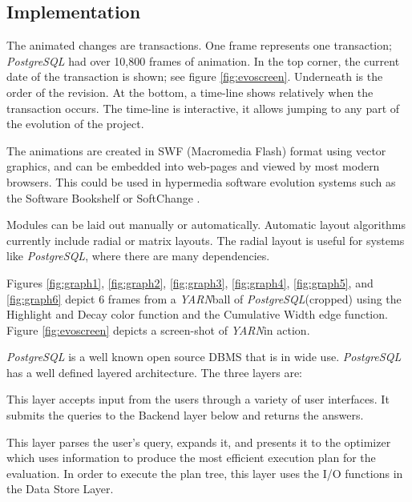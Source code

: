 \documentclass[times, 10pt,twocolumn]{article}
\newcommand{\yarn}{\emph{YARN\xspace}}
\newcommand{\postgresql}{\emph{PostgreSQL}\xspace}
\newcommand{\Subsection}[1]{\subsection{#1}}
\newcommand{\shtn}{\vspace*{-.5em}}
\begin{document}
\shtn
\Subsection{Implementation}
\shtn

The animated changes are transactions. One frame represents one
transaction; \postgresql had over 10,800 frames of animation.  In the
top corner, the current date of the transaction is shown; see figure
\ref{fig:evoscreen}.  Underneath is the order of the revision. At the
bottom, a time-line shows relatively when the transaction occurs.
The time-line is interactive, it allows jumping to any part of the
evolution of the project. 

The animations are created in SWF (Macromedia Flash) format using
vector graphics, and can be embedded into web-pages and viewed by most
modern browsers.  This could be used in hypermedia software evolution
systems such as the Software Bookshelf \cite{pbs} or SoftChange
\cite{dmgseke2004}.

Modules can be laid out manually or automatically. Automatic layout
algorithms currently include radial or matrix layouts. The radial
layout is useful for systems like \postgresql, where there are many
dependencies.

Figures \ref{fig:graph1}, \ref{fig:graph2}, \ref{fig:graph3},
\ref{fig:graph4}, \ref{fig:graph5}, and \ref{fig:graph6} depict 6
frames from a \yarn ball of \postgresql (cropped) using the Highlight
and Decay color function and the Cumulative Width edge function.
Figure \ref{fig:evoscreen} depicts a screen-shot of \yarn in action.

\shtn
\Section{Exploratory Case Study of \postgresql}
\shtn



\postgresql is a well known open source DBMS that is in wide use.
\postgresql has a well defined layered architecture.
The three layers are:

 This layer accepts input from the
users through a variety of user interfaces.  It submits the queries to
the Backend layer below and returns the answers.

 This layer parses the user's query, expands it, and
presents it to the optimizer which uses information to produce the
most efficient execution plan for the evaluation.  In order to execute
the plan tree, this layer uses the I/O functions in the Data Store
Layer.
\end{document}
